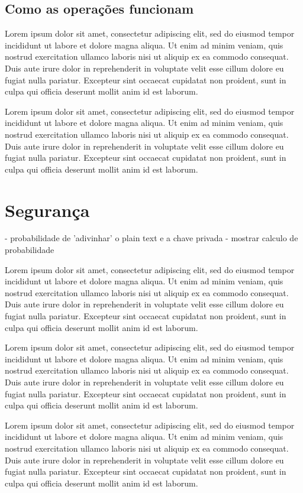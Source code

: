 	\subsection{Como as operações funcionam}
	Lorem ipsum dolor sit amet, consectetur adipiscing elit, sed do eiusmod tempor incididunt ut labore et dolore magna aliqua. Ut enim ad minim veniam, quis nostrud exercitation ullamco laboris nisi ut aliquip ex ea commodo consequat. Duis aute irure dolor in reprehenderit in voluptate velit esse cillum dolore eu fugiat nulla pariatur. Excepteur sint occaecat cupidatat non proident, sunt in culpa qui officia deserunt mollit anim id est laborum.
  
	Lorem ipsum dolor sit amet, consectetur adipiscing elit, sed do eiusmod tempor incididunt ut labore et dolore magna aliqua. Ut enim ad minim veniam, quis nostrud exercitation ullamco laboris nisi ut aliquip ex ea commodo consequat. Duis aute irure dolor in reprehenderit in voluptate velit esse cillum dolore eu fugiat nulla pariatur. Excepteur sint occaecat cupidatat non proident, sunt in culpa qui officia deserunt mollit anim id est laborum.
	
\newpage

\section{Segurança}
- probabilidade de 'adivinhar' o plain text e a chave privada
- mostrar calculo de probabilidade

Lorem ipsum dolor sit amet, consectetur adipiscing elit, sed do eiusmod tempor incididunt ut labore et dolore magna aliqua. Ut enim ad minim veniam, quis nostrud exercitation ullamco laboris nisi ut aliquip ex ea commodo consequat. Duis aute irure dolor in reprehenderit in voluptate velit esse cillum dolore eu fugiat nulla pariatur. Excepteur sint occaecat cupidatat non proident, sunt in culpa qui officia deserunt mollit anim id est laborum.
  
Lorem ipsum dolor sit amet, consectetur adipiscing elit, sed do eiusmod tempor incididunt ut labore et dolore magna aliqua. Ut enim ad minim veniam, quis nostrud exercitation ullamco laboris nisi ut aliquip ex ea commodo consequat. Duis aute irure dolor in reprehenderit in voluptate velit esse cillum dolore eu fugiat nulla pariatur. Excepteur sint occaecat cupidatat non proident, sunt in culpa qui officia deserunt mollit anim id est laborum.

Lorem ipsum dolor sit amet, consectetur adipiscing elit, sed do eiusmod tempor incididunt ut labore et dolore magna aliqua. Ut enim ad minim veniam, quis nostrud exercitation ullamco laboris nisi ut aliquip ex ea commodo consequat. Duis aute irure dolor in reprehenderit in voluptate velit esse cillum dolore eu fugiat nulla pariatur. Excepteur sint occaecat cupidatat non proident, sunt in culpa qui officia deserunt mollit anim id est laborum.

